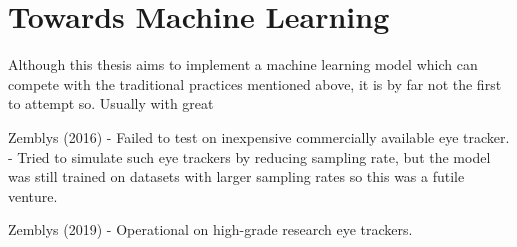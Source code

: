 \section{Towards Machine Learning} \label{sec:pw_TowardsMachineLearning}

Although this thesis aims to implement a machine learning model which can compete with the traditional practices mentioned above, it is by far not the first to attempt so. Usually with great 

Zemblys (2016)
- Failed to test on inexpensive commercially available eye tracker.
    - Tried to simulate such eye trackers by reducing sampling rate, but the model was still trained on datasets with larger sampling rates so this was a futile venture.

Zemblys (2019)
- Operational on high-grade research eye trackers.